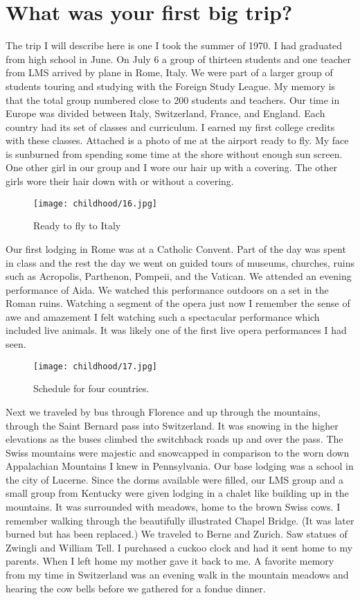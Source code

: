 \section{What was your first big trip?}
The trip I will describe here is one I took the summer of 1970.
I had graduated from high school in June.
On July 6 a group of thirteen students and one teacher from LMS arrived by plane in Rome, Italy.
We were part of a larger group of students touring and studying with the Foreign Study League.
My memory is that the total group numbered close to 200 students and teachers.
Our time in Europe was divided between Italy, Switzerland, France, and England.
Each country had its set of classes and curriculum.
I earned my first college credits with these classes.
Attached is a photo of me at the airport ready to fly.
My face is sunburned from spending some time at the shore without enough sun screen.
One other girl in our group and I wore our hair up with a covering.
The other girls wore their hair down with or without a covering.
\begin{figure}
\centering
\texttt{[image: childhood/16.jpg]}
\caption{
Ready to fly to Italy
}
\end{figure}

Our first lodging in Rome was at a Catholic Convent.
Part of the day was spent in class and the rest the day we went on guided tours of museums, churches, ruins such as Acropolis, Parthenon, Pompeii, and the Vatican.
We attended an evening performance of Aida.
We watched this performance outdoors on a set in the Roman ruins.
Watching a segment of the opera just now I remember the sense of awe and amazement I felt watching such a spectacular performance which included live animals.
It was likely one of the first live opera performances I had seen.
\begin{figure}
\centering
\texttt{[image: childhood/17.jpg]}
\caption{
Schedule for four countries.
}
\end{figure}
Next we traveled by bus through Florence and up through the mountains, through the Saint Bernard pass into Switzerland.
It was snowing in the higher elevations as the buses climbed the switchback roads up and over the pass.
The Swiss mountains were majestic and snowcapped in comparison to the worn down Appalachian Mountains I knew in Pennsylvania.
Our base lodging was a school in the city of Lucerne.
Since the dorms available were filled, our LMS group and a small group from Kentucky were given lodging in a chalet like building up in the mountains.
It was surrounded with meadows, home to the brown Swiss cows.
I remember walking through the beautifully illustrated Chapel Bridge.
(It was later burned but has been replaced.)
We traveled to Berne and Zurich.
Saw statues of Zwingli and William Tell.
I purchased a cuckoo clock and had it sent home to my parents.
When I left home my mother gave it back to me.
A favorite memory from my time in Switzerland was an evening walk in the mountain meadows and hearing the cow bells before we gathered for a fondue dinner.

